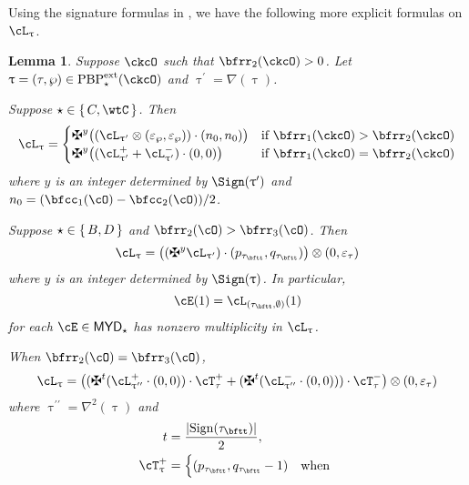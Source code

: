 \documentclass[12pt,a4paper]{amsart}
\def\MYD{{\mathsf{MYD}}}
\def\abs#1{\left|{#1}\right|}
\def\DD{\nabla}
\numberwithin{equation}{section}
\newtheorem{lem}[thm]{Lemma}
\theoremstyle{remark}
\def\ssign{\mathrm{Sign}}
\def\PBPes{\mathrm{PBP}^{\mathrm{ext}}_{\star}}
\def\uptaup{\uptau^{\prime}}
\def\uptaupp{\uptau^{\prime\prime}}
\begin{document}
Using the signature formulas in , we have the following more
explicit formulas on $\ac_{\uptau}$.
\begin{lem}\label{lem:dlift}
  Suppose $\ckcO$ such that $\bfrr_{2}(\ckcO)>0$. Let
  $\uptau = (\tau,\wp)\in \PBPes(\ckcO)$ and $\uptaup = \DD(\uptau)$.
\begin{enuma}
  \item
  Suppose $\star\in \set{C,\wtC}$.  Then
  \begin{equation}\label{eq:C}
    \ac_{\uptau}=
    \begin{cases}
      \maltese^{y}\big( (\ac_{\uptau'}\lotimes (\varepsilon_{\wp},\varepsilon_{\wp}))
      \cdot (n_{0},n_{0})\big) & \text{if } \bfrr_{1}(\ckcO)>\bfrr_{2}(\ckcO)\\
      \maltese^{y}\big( (\pac{\uptau'} + \nac{\uptaup})\cdot (0,0) \big)
      & \text{if } \bfrr_{1}(\ckcO)=\bfrr_{2}(\ckcO)
    \end{cases}
  \end{equation}
  where $y$ is an integer determined by $\Sign(\uptaup)$ and $n_{0} = (\bfcc_{1}(\cO)-\bfcc_{2}(\cO))/2$.
  \item
  Suppose $\star\in \set{B,D}$ and $\bfrr_{2}(\cO)>\bfrr_{3}(\cO)$. Then
  \begin{equation}\label{eq:BD}
    \ac_{\uptau}= \big((\maltese^{y}\ac_{\uptau'})\cdot (p_{\tau_{\bftt}},q_{\tau_{\bftt}})\big)
    \lotimes (0,\varepsilon_{\tau})
  \end{equation}
  where $y$ is an integer determined by $\Sign(\uptau)$.
  In particular,
  \begin{equation}\label{eq:TBD}
    \cE(1) = \ac_{(\tau_{\bftt},\emptyset)}(1)
  \end{equation}
  for each $\cE\in \MYD_\star$ has nonzero multiplicity in $\ac_{\uptau}$.
  \item
  When  $\bfrr_{2}(\cO)=\bfrr_{3}(\cO)$,
  \begin{equation}\label{eq:BD2}
    \ac_{\uptau} =
    \big((\maltese^t (\pac{\uptaupp}\cdot (0,0)) \cdot \pcT_{\tau}
    +  (\maltese^t(\nac{\uptaupp}\cdot (0,0)) ) \cdot \ncT_{\tau}\big)\lotimes(0,\varepsilon_{\tau})
  \end{equation}
  where $\uptaupp = \DD^{2}(\uptau)$ and
  \[
  \begin{split}
    t &  = \frac{\abs{\ssign(\tau_{\bftt})}}{2},\\
    \pcT_{\uptau}& = \begin{cases} (p_{\tau_{\bftt}},q_{\tau_{\bftt}}-1) & \text{when
}
\end{cases}
\end{split}\]
\end{enuma}
\end{lem}
\end{document}
